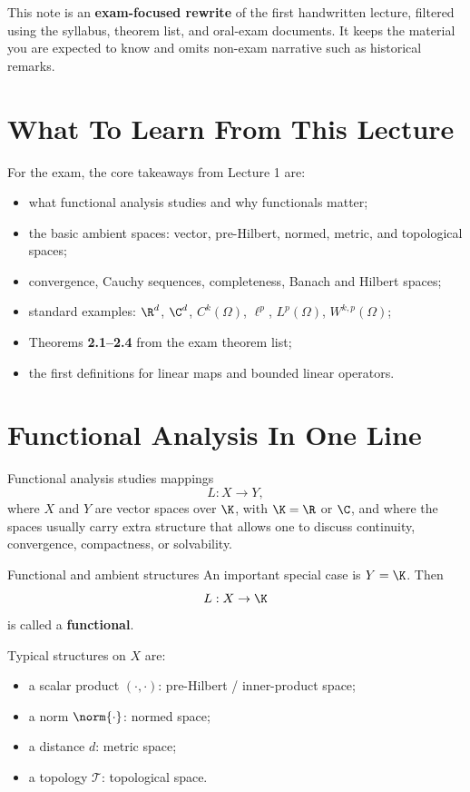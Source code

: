 \documentclass[header={Lecture 1 Exam Study Notes}]{study-note}
\newcommand{\Lp}{L^p}
\begin{document}

\vspace{0.8em}

\begin{focusbox}
This note is an \textbf{exam-focused rewrite} of the first handwritten lecture, filtered using the syllabus, theorem list, and oral-exam documents. It keeps the material you are expected to know and omits non-exam narrative such as historical remarks.
\end{focusbox}

\tableofcontents

\section{What To Learn From This Lecture}

\begin{focusbox}
For the exam, the core takeaways from Lecture 1 are:
\begin{itemize}
\item what functional analysis studies and why functionals matter;
\item the basic ambient spaces: vector, pre-Hilbert, normed, metric, and topological spaces;
\item convergence, Cauchy sequences, completeness, Banach and Hilbert spaces;
\item standard examples: $\R^d$, $\C^d$, $C^k(\Omega)$, $\ell^p$, $\Lp(\Omega)$, $W^{k,p}(\Omega)$;
\item Theorems \textbf{2.1--2.4} from the exam theorem list;
\item the first definitions for linear maps and bounded linear operators.
\end{itemize}
\end{focusbox}

\section{Functional Analysis In One Line}

Functional analysis studies mappings
\[
L:X\to Y,
\]
where $X$ and $Y$ are vector spaces over $\K$, with $\K=\R$ or $\C$, and where the spaces usually carry extra structure that allows one to discuss continuity, convergence, compactness, or solvability.

\begin{defbox}{Functional and ambient structures}
An important special case is $Y=\K$. Then
\[
L:X\to \K
\]
is called a \textbf{functional}.

Typical structures on $X$ are:
\begin{itemize}
\item a scalar product $(\cdot,\cdot)$: pre-Hilbert / inner-product space;
\item a norm $\norm{\cdot}$: normed space;
\item a distance $d$: metric space;
\item a topology $\mathcal T$: topological space.
\end{itemize}
\end{defbox}
\end{document}
